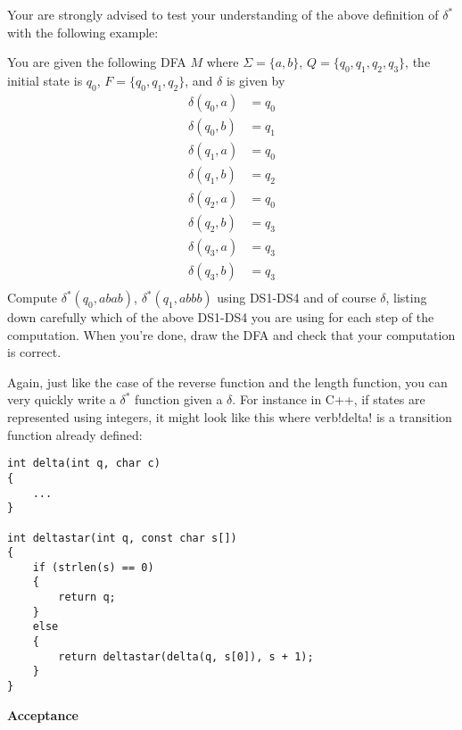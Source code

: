 Your are strongly advised to test your understanding of the above
definition of $\delta^*$ with the following example:

You are given the following DFA $M$ where
$\Sigma = \{a, b\}$, $Q = \{q_0, q_1, q_2, q_3\}$, the initial state is $q_0$,
$F = \{q_0, q_1, q_2\}$, and $\delta$ is given by
\begin{align*}
\delta(q_0, a) &= q_0 \\
\delta(q_0, b) &= q_1 \\
\delta(q_1, a) &= q_0 \\
\delta(q_1, b) &= q_2 \\
\delta(q_2, a) &= q_0 \\
\delta(q_2, b) &= q_3 \\
\delta(q_3, a) &= q_3 \\
\delta(q_3, b) &= q_3 \\
\end{align*}
Compute $\delta^*(q_0, abab)$, $\delta^*(q_1, abbb)$ using DS1-DS4
and of course
$\delta$, listing down carefully which of the above DS1-DS4 you are using for
each step of the computation.
When you're done, draw the DFA and check that your computation is correct.

Again, just like the case of the reverse function and the length function,
you can very quickly write a $\delta^*$ function given a $\delta$.
For instance in C++, if states are represented using integers, it might
look like this where 
verb!delta! is a transition function already defined:
\begin{Verbatim}[frame=single]
int delta(int q, char c)
{
    ...
}

int deltastar(int q, const char s[])
{
    if (strlen(s) == 0) 
    {
        return q;
    }
    else 
    {
        return deltastar(delta(q, s[0]), s + 1);
    }
}
\end{Verbatim}

\newpage
{\bf Acceptance}

